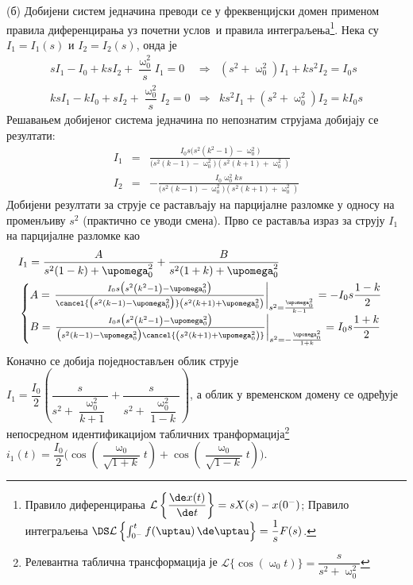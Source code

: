 (б) Добијени систем једначина преводи се у фреквенцијски домен применом правила диференцирања 
уз почетни услов\ и правила интеграљења\footnote{Правило диференцирања $\mathcal{L} \left\{ \dfrac{\de x(t)}{\de t} \right\}
= s X(s) - x(0^-)$; Правило интеграљења 
$\DS \mathcal{L} \left\{ \int_{0^-}^{t} f(\uptau) \, \de \uptau \right\} = \dfrac{1}{s} F(s)$. }. 
Нека су $I_1 = I_1(s)$ и $I_2 = I_2(s)$, онда је
\begin{eqnarray}
    sI_1 - I_0 + ksI_2 + \dfrac{\upomega_0^2}{s} I_1 = 0
    & \Rightarrow & 
    (s^2 + \upomega_0^2) I_1 + ks^2 I_2 = I_0 s \\
    ksI_1 - kI_0 + sI_2 + \dfrac{\upomega_0^2}{s} I_2 = 0
    & \Rightarrow & 
    ks^2 I_1 + (s^2 + \upomega_0^2) I_2 = k I_0 s
\end{eqnarray}
Решавањем добијеног система једначина по непознатим струјама добијају се резултати: 
\begin{eqnarray}
    I_1 &=& \frac{I_{0} s \bigl(s^{2} \left(k^{2} - 1\right) - \upomega_{0}^{2} \bigr)}{\bigl(s^{2} \left(k - 1\right) - \upomega_{0}^{2} \bigr) \left(s^{2} \left(k + 1\right) + \upomega_{0}^{2}\right)} \\[2mm]
    I_2 &=& - \frac{I_{0} \upomega_{0}^{2} k s}{\bigl(s^{2} \left(k - 1\right) - \upomega_{0}^{2} \bigr) \left(s^{2} \left(k + 1\right) + \upomega_{0}^{2}\right)}
    \label{eq:\ID_i2s}
\end{eqnarray}
Добијени резултати за струје се растављају на парцијалне разломке у односу на променљиву 
$s^2$ (практично се уводи смена). Прво се раставља израз за струју $I_1$ на парцијалне разломке
као
\begin{eqnarray}
    &I_1 = \dfrac{A}{s^2(1 - k) + \upomega_0^2} + \dfrac{B}{s^2(1+k) + \upomega_0^2} \\ 
    &
    \begin{cases}
    A = 
    \left.
    \frac{I_{0} s \bigl(s^{2} \left(k^{2} - 1\right) - \upomega_{0}^{2} \bigr)}
    { \cancel{\bigl(s^{2} \left(k - 1\right) - \upomega_{0}^{2} \bigr)} \left(s^{2} \left(k + 1\right) + \upomega_{0}^{2}\right)}
    \right\rvert_{s^2 = \frac{\upomega_0^2}{k-1}}
    = -I_0 s \dfrac{1-k}{2} 
        \\    
    B = \left.
        \frac{I_{0} s \bigl(s^{2} \left(k^{2} - 1\right) - \upomega_{0}^{2} \bigr)}
        { \bigl(s^{2} \left(k - 1\right) - \upomega_{0}^{2} \bigr) \cancel{\left(s^{2} \left(k + 1\right) + \upomega_{0}^{2}\right)}}
    \right\rvert_{s^2 = -\frac{\upomega_0^2}{1 + k}}
    = I_0 s \dfrac{1+k}{2}
    \end{cases}
\end{eqnarray}
Коначно се добија поједностављен облик струје $I_1 = 
\dfrac{I_0}{2} \left(  
    \dfrac{s}{s^2 + \dfrac{\upomega_0^2}{k+1} }
    +
    \dfrac{s}{s^2 + \dfrac{\upomega_0^2}{1-k}}
\right)$,
а облик у временском домену се одређује непосредном идентификацијом табличних 
транформација\footnote{Релевантна таблична трансформација је 
$\mathcal{L} \{ \cos(\upomega_0 t) \} = \dfrac{s}{s^2 + \upomega_0^2} $}
$i_1(t) = \dfrac{I_0}{2} 
\Biggl(
    \cos \left( \dfrac{\upomega_0}{\sqrt{1+k}}t\right) + \cos\left(\dfrac{\upomega_0}{\sqrt{1-k}}t\right) 
\Biggr)$. 


